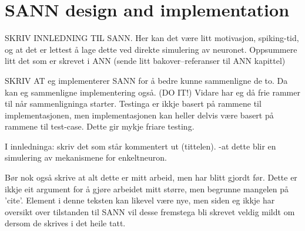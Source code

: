 
%






\section{SANN design and implementation}
\label{secSANN} 


	SKRIV INNLEDNING TIL SANN.
	Her kan det være litt motivasjon, spiking-tid, og at det er lettest å lage dette ved direkte simulering av neuronet.
	Oppsummere litt det som er skrevet i ANN (sende litt bakover--referanser til ANN kapittel)

	SKRIV AT eg implementerer SANN for å bedre kunne sammenligne de to. Da kan eg sammenligne implementering også. (DO IT!)
	Vidare har eg då frie rammer til når sammenligninga starter. Testinga er ikkje basert på rammene til implementasjonen, men implementasjonen kan heller delvis være basert på rammene til test-case. Dette gir mykje friare testing.

	I innledninga: skriv det som står kommentert ut (tittelen). -at dette blir en simulering av mekanismene for enkeltneuron.

	Bør nok også skrive at alt dette er mitt arbeid, men har blitt gjordt før.
	Dette er ikkje eit argument for å gjøre arbeidet mitt større, men begrunne mangelen på 'cite'.
	Element i denne teksten kan likevel være nye, men siden eg ikkje har oversikt over tilstanden til SANN vil desse fremstega bli skrevet veldig mildt om dersom de skrives i det heile tatt.

